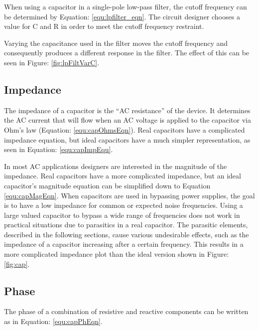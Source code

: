 
When using a capacitor in a single-pole low-pass filter, the cutoff frequency can be determined by Equation: \eqref{equ:lpfilter_eqn}. The circuit designer chooses a value for C and R in order to meet the cutoff frequency restraint.


Varying the capacitance used in the filter moves the cutoff frequency and consequently produces a different response in the filter. The effect of this can be seen in Figure: \ref{fig:lpFiltVarC}.



\subsection{Impedance}

The impedance of a capacitor is the ``AC resistance'' of the device. It determines the AC current that will flow when an AC voltage is applied to the capacitor via Ohm's law (Equation: \eqref{equ:capOhmsEqn}). Real capacitors have a complicated impedance equation, but ideal capacitors have a much simpler representation, as seen in Equation: \eqref{equ:capImpEqu}.


In most AC applications designers are interested in the magnitude of the impedance. Real capacitors have a more complicated impedance, but an ideal capacitor's magnitude equation can be simplified down to Equation \eqref{equ:capMagEqn}. When capacitors are used in bypassing power supplies, the goal is to have a low impedance for common or expected noise frequencies. Using a large valued capacitor to bypass a wide range of frequencies does not work in practical situations due to parasitics in a real capacitor. The parasitic elements, described in the following sections, cause various undesirable effects, such as the impedance of a capacitor increasing after a certain frequency. This results in a more complicated impedance plot than the ideal version shown in Figure: \ref{fig:cap}.



\subsection{Phase}

The phase of a combination of resistive and reactive components can be written as in Equation: \eqref{equ:capPhEqn}.

